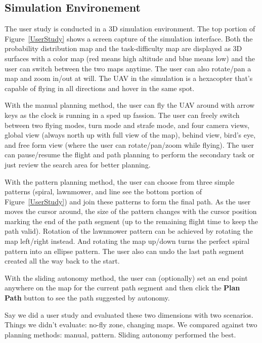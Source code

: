 \documentclass[journal]{IEEEtran}
\begin{document}
\subsection{Simulation Environement}

The user study is conducted in a 3D simulation environment. The top portion of Figure~\ref{UserStudy} shows a screen capture of the simulation interface. Both the probability distribution map and the task-difficulty map are displayed as 3D surfaces with a color map (red means high altitude and blue means low) and the user can switch between the two maps anytime. The user can also rotate/pan a map and zoom in/out at will. The UAV in the simulation is a hexacopter that's capable of flying in all directions and hover in the same spot.

With the manual planning method, the user can fly the UAV around with arrow keys as the clock is running in a sped up fassion. The user can freely switch between two flying modes, turn mode and strafe mode, and four camera views, global view (always north up with full view of the map), behind view, bird's eye, and free form view (where the user can rotate/pan/zoom while flying). The user can pause/resume the flight and path planning to perform the secondary task or just review the search area for better planning.

With the pattern planning method, the user can choose from three simple patterns (spiral, lawnmower, and line see the bottom portion of Figure~\ref{UserStudy}) and join these patterns to form the final path. As the user moves the cursor around, the size of the pattern changes with the cursor position marking the end of the path segment (up to the remaining flight time to keep the path valid). Rotation of the lawnmower pattern can be achieved by rotating the map left/right instead. And rotating the map up/down turns the perfect spiral pattern into an ellipse pattern. The user also can undo the last path segment created all the way back to the start.

With the sliding autonomy method, the user can (optionally) set an end point anywhere on the map for the current path segment and then click the \textbf{Plan Path} button to see the path suggested by autonomy.  

Say we did a user study and evaluated these two dimensions with two scenarios. Things we didn't evaluate: no-fly zone, changing maps.
We compared against two planning methods: manual, pattern. Sliding autonomy performed the best.
\end{document}
